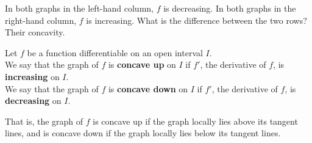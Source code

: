 \documentclass{ximera}
\begin{document}
\begin{image}
\end{image}

In both graphs in the left-hand column, $f$ is decreasing.  In both graphs in the right-hand column,
$f$ is increasing.  What is the difference between the two rows?  Their concavity.
\begin{definition}
	Let $f$ be a  function differentiable on an open interval $I$.\\
		We say that the graph of  $f$ is \textbf{concave up} on $I$ if  $f'$, the derivative of $f$, is \textbf{increasing} on $I$.\\
		We say that the graph of  $f$ is \textbf{concave down} on $I$ if $f'$, the derivative of $f$, is \textbf{decreasing} on $I$.
\end{definition}
That is, the graph of $f$ is concave up if the graph locally lies above its tangent lines, and is concave down if the graph locally lies below its tangent lines.
\end{document}
